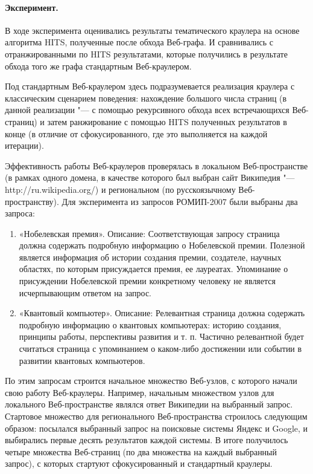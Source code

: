 \paragraph{Эксперимент.} В ходе эксперимента оценивались результаты тематического краулера на основе алгоритма HITS, полученные после обхода Веб-графа. И сравнивались с отранжированными по HITS результатами, которые получились в результате обхода того же графа стандартным Веб-краулером.

Под стандартным Веб-краулером здесь подразумевается реализация краулера с классическим сценарием поведения: нахождение большого числа страниц (в данной реализации "--- с помощью рекурсивного обхода всех встречающихся Веб-страниц) и затем ранжирование с помощью HITS полученных результатов в конце (в отличие от сфокусированного, где это выполняется на каждой итерации).

Эффективность работы Веб-краулеров проверялась в локальном Веб-пространстве (в рамках одного домена, в качестве которого был выбран сайт Википедия "--- http://ru.wikipedia.org/) и региональном (по русскоязычному Веб-пространству). Для эксперимента из запросов РОМИП-2007 были выбраны два запроса:

\begin{enumerate}
	\item «Нобелевская премия». Описание: Соответствующая запросу страница должна содержать подробную информацию о Нобелевской премии. Полезной является информация об истории создания премии, создателе, научных областях, по которым присуждается премия, ее лауреатах. Упоминание о присуждении Нобелевской премии конкретному человеку не является исчерпывающим ответом на запрос.
	\item «Квантовый компьютер». Описание: Релевантная страница должна содержать подробную информацию о квантовых компьютерах: историю создания, принципы работы, перспективы развития и т. п. Частично релевантной будет считаться страница с упоминанием о каком-либо достижении или событии в развитии квантовых компьютеров.
\end{enumerate}

По этим запросам строится начальное множество Веб-узлов, с которого начали свою работу Веб-краулеры. Например, начальным множеством узлов для локального Веб-пространстве являлся ответ Википедии на выбранный запрос. Стартовое множество для регионального Веб-пространства строилось следующим образом: посылался выбранный запрос на поисковые системы Яндекс и Google, и выбирались первые десять результатов каждой системы. В итоге получилось четыре множества Веб-страниц (по два множества на каждый выбранный запрос), с которых стартуют сфокусированный и стандартный краулеры.


